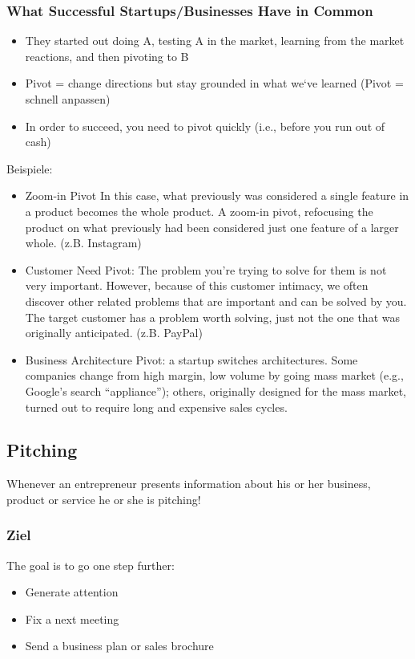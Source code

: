 \subsubsection{What Successful Startups/Businesses Have in Common}
\begin{itemize}
	\item They started out doing A, testing A in the market, learning from the market reactions, and then pivoting to B
	\item Pivot = change directions but stay grounded in what we‘ve learned (Pivot = schnell anpassen)
	\item In order to succeed, you need to pivot quickly (i.e., before you run out of cash)
\end{itemize}
Beispiele:
\begin{itemize}
	\item Zoom-in Pivot In this case, what previously was considered a single feature in a product becomes the whole product. A zoom-in pivot, refocusing the product on what previously had been considered just one feature of a larger whole. (z.B. Instagram)
	\item Customer Need Pivot: The problem you’re trying to solve for them is not very important. However, because of this customer intimacy, we often discover other related problems that are important and can be solved by you. The target customer has a problem worth solving, just not the one that was originally anticipated. (z.B. PayPal)
	\item Business Architecture Pivot: a startup switches architectures. Some companies change from high margin, low volume by going mass market (e.g., Google’s search “appliance”); others, originally designed for the mass market, turned out to require long and expensive sales cycles.
\end{itemize}

\subsection{Pitching}
Whenever an entrepreneur presents information about his or her business, product or service he or she is pitching!

\subsubsection{Ziel}
The goal is to go one step further:
\begin{itemize}
	\item Generate attention
	\item Fix a next meeting
	\item Send a business plan or sales brochure
\end{itemize}

